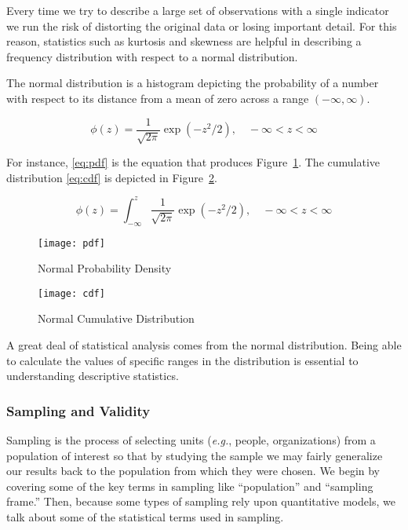 Every time we try to describe a large set of observations with a single indicator we run the risk of distorting the original data or losing important detail. For this reason, statistics such as kurtosis and skewness are helpful in describing a frequency distribution with respect to a normal distribution.

The normal distribution is a histogram depicting the probability of a number with respect to its distance from a mean of zero across a range $(- \infty , \infty)$.

\begin{equation}
\phi(z) = \frac{1}{\sqrt{2 \pi}} \exp(-z^2/2), \quad - \infty < z < \infty
\label{eq:pdf}
\end{equation}

For instance,  \eqref{eq:pdf} is the equation that produces Figure~\ref{figure:pdf}.
The cumulative distribution \eqref{eq:cdf} is depicted in Figure~\ref{figure:cdf}.

\begin{equation}
\phi(z) = \int^z_{-\infty} \frac{1}{\sqrt{2 \pi}} \exp(-z^2/2), \quad - \infty < z < \infty
\label{eq:cdf}
\end{equation}

\begin{figure}[t]
  \centering
  \texttt{[image: pdf]}
  \caption{Normal Probability Density}
  \label{figure:pdf}
\end{figure}

\begin{figure}[t]
  \centering
  \texttt{[image: cdf]}
  \caption{Normal Cumulative Distribution}
  \label{figure:cdf}
\end{figure}

A great deal of statistical analysis comes from the normal distribution. Being able to calculate the values of specific ranges in the distribution is essential to understanding descriptive statistics.

\subsubsection{Sampling and Validity}
Sampling is the process of selecting units (\textit{e.g.}, people, organizations) from a population of interest so that by studying the sample we may fairly generalize our results back to the population from which they were chosen. We begin by covering some of the key terms in sampling like ``population'' and ``sampling frame.'' Then, because some types of sampling rely upon quantitative models, we talk about some of the statistical terms used in sampling.

